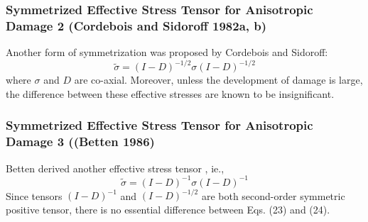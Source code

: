 \documentclass[a4paper,12pt]{article}
\begin{document}
\subsubsection{Symmetrized Effective Stress Tensor for Anisotropic Damage 2 (Cordebois and Sidoroff 1982a, b)}
\indent\indent\indent Another form of symmetrization was proposed by Cordebois and Sidoroff:
\begin{equation}
\tilde{\sigma} =  (I - D)^{-1/2}\sigma(I - D)^{-1/2}
\end{equation}
where $\sigma$ and $D$ are co-axial. Moreover, unless the development of damage is large, the difference between these effective stresses are known to be insignificant.\\
\subsubsection{Symmetrized Effective Stress Tensor for Anisotropic Damage 3 ((Betten 1986)}
\indent\indent\indent  Betten derived another effective stress tensor , ie.,
\begin{equation}
\tilde{\sigma} =  (I - D)^{-1}\sigma(I - D)^{-1}
\end{equation} 
Since tensors $(I - D)^{-1}$ and $(I - D)^{-1/2}$ are both second-order symmetric positive tensor, there is no essential difference between Eqs. (23) and (24). 
\end{document}
